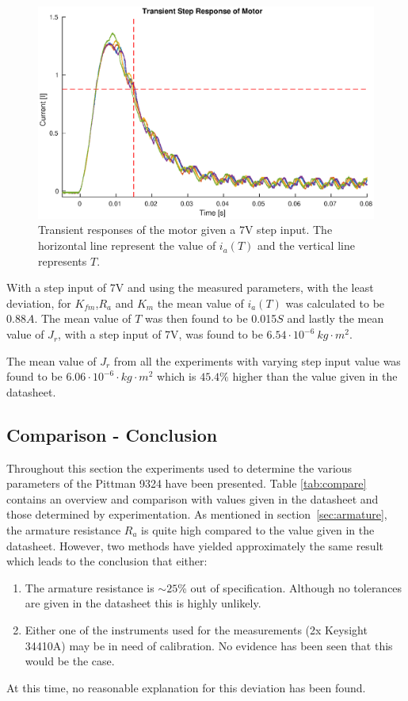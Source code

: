 \begin{figure}[!h]
	\centering
	\includegraphics[width=\linewidth]{graphics/transient_response_inertia}
	\caption[Transient responses of the motor given a 7V step input.]{Transient responses of the motor given a 7V step input. The horizontal line represent the value of $i_a(T)$ and the vertical line represents $T$.}
	\label{fig:inertia_trans_plot}
\end{figure}

With a step input of 7V and using the measured parameters, with the least deviation, for $K_{fm}$,$R_a$ and $K_m$ the mean value of $i_a(T)$ was calculated to be 0.88$A$. 
The mean value of $T$ was then found to be 0.015$S$ and lastly the mean value of $J_r$, with a step input of 7V, was found to be $6.54 \cdot 10^{-6}\: kg \cdot m^2$.

\par
The mean value of $J_r$ from all the experiments with varying step input value was found to be $ 6.06 \cdot 10^{-6} \cdot kg \cdot m^2$ which is $45.4\%$ higher than the value given in the datasheet. 

\subsection{Comparison - Conclusion}
Throughout this section the experiments used to determine the various parameters of the Pittman 9324 have been presented.
Table \ref{tab:compare} contains an overview and comparison with values given in the datasheet and those determined by experimentation.
As mentioned in section~\ref{sec:armature}, the armature resistance $R_a$ is quite high compared to the value given in the datasheet.
However, two methods have yielded approximately the same result which leads to the conclusion that either:
\begin{enumerate}
	\item The armature resistance is $\sim25$\% out of specification. 
	Although no tolerances are given in the datasheet this is highly unlikely.
	\item Either one of the instruments used for the measurements (2x Keysight 34410A) may be in need of calibration. 
	No evidence has been seen that this would be the case.
\end{enumerate}
At this time, no reasonable explanation for this deviation has been found.

